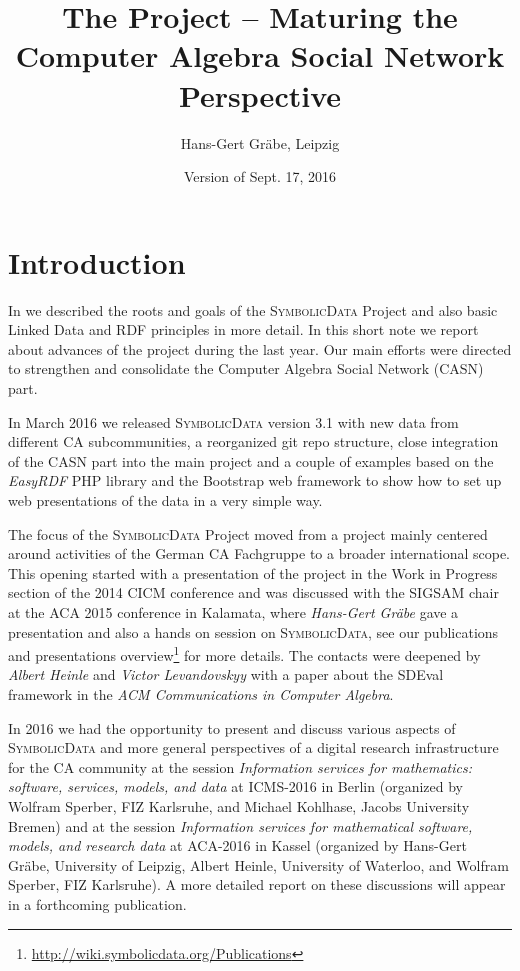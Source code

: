 \documentclass[a4paper,11pt]{article}
\title{The {\SD} Project -- Maturing the Computer Algebra Social Network
  Perspective}
\author{Hans-Gert Gr\"abe, Leipzig}
\date{Version of Sept. 17, 2016}
\def\SD{\textsc{SymbolicData}}
\begin{document}
\maketitle

\section{Introduction}

In \cite{car-55,cicm-14,icms-16,aca-16} we described the roots and goals of the
{\SD} Project and also basic Linked Data and RDF principles in more detail.  In
this short note we report about advances of the project during the last year.
Our main efforts were directed to strengthen and consolidate the Computer
Algebra Social Network (CASN) part.

In March 2016 we released {\SD} version 3.1 with new data from different CA
subcommunities, a reorganized git repo structure, close integration of the CASN
part into the main project and a couple of examples based on the \emph{EasyRDF}
PHP library and the Bootstrap web framework to show how to set up web
presentations of the data in a very simple way.

The focus of the {\SD} Project moved from a project mainly centered around
activities of the German CA Fachgruppe to a broader international scope.  This
opening started with a presentation of the project in the Work in Progress
section of the 2014 CICM conference and was discussed with the SIGSAM chair at
the ACA 2015 conference in Kalamata, where {\emph{Hans-Gert Gr\"abe}} gave a
presentation and also a hands on session on {\SD}, see our publications and
presentations overview\footnote{
  \url{http://wiki.symbolicdata.org/Publications}} for more details.  The
contacts were deepened by \emph{Albert Heinle} and \emph{Victor Levandovskyy}
with a paper \cite{heinle-15} about the SDEval framework in the \emph{ACM
  Communications in Computer Algebra}.

In 2016 we had the opportunity to present and discuss various aspects of {\SD}
and more general perspectives of a digital research infrastructure for the CA
community at the session \emph{Information services for mathematics: software,
  services, models, and data} at ICMS-2016 in Berlin (organized by Wolfram
Sperber, FIZ Karlsruhe, and Michael Kohlhase, Jacobs University Bremen) and at
the session \emph{Information services for mathematical software, models, and
  research data} at ACA-2016 in Kassel (organized by Hans-Gert Gr\"abe,
University of Leipzig, Albert Heinle, University of Waterloo, and Wolfram
Sperber, FIZ Karlsruhe).  A more detailed report on these discussions will
appear in a forthcoming publication.
\end{document}
